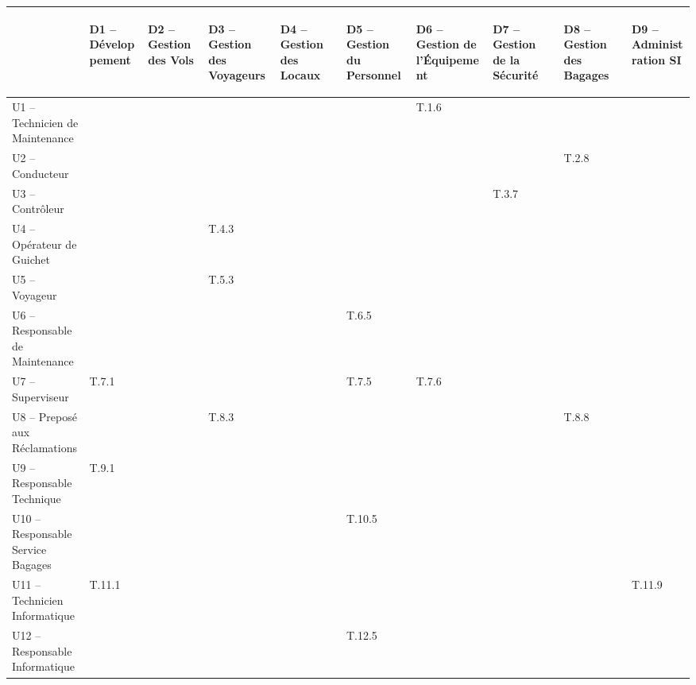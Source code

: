 \providecommand{\DJSPU}[1]{}

\begin{turn}{-90}
\begin {tabular} {| l | l | l | l | l | l | l | l | l | l | }
\hline
~
&\begin{sideways}D1 -- Développement\end{sideways}
&\begin{sideways}D2 -- Gestion des Vols\end{sideways}
&\begin{sideways}D3 -- Gestion des Voyageurs\end{sideways}
&\begin{sideways}D4 -- Gestion des Locaux\end{sideways}
&\begin{sideways}D5 -- Gestion du Personnel\end{sideways}
&\begin{sideways}D6 -- Gestion de l'Équipement\end{sideways}
&\begin{sideways}D7 -- Gestion de la Sécurité\end{sideways}
&\begin{sideways}D8 -- Gestion des Bagages\end{sideways}
&\begin{sideways}D9 -- Administration SI\end{sideways}\\
\hline
U1 --  Technicien de Maintenance  & & & & & &T.1.6 & & &  \\
\hline
U2 --  Conducteur  & & & & & & & &T.2.8 &  \\
\hline
U3 --  Contrôleur  & & & & & & &T.3.7 & &  \\
\hline
U4 --  Opérateur de Guichet  & & &T.4.3 & & & & & &  \\
\hline
U5 --  Voyageur  & & &T.5.3 & & & & & &  \\
\hline
U6 --  Responsable de Maintenance  & & & & &T.6.5 & & &  &\\
\hline
U7 --  Superviseur  &\DJSPU1 T.7.1 & & & & T.7.5 &T.7.6 & & &\\
\hline
U8 --  Preposé aux Réclamations  & & &T.8.3 & & & & &T.8.8 &\\
\hline
U9 --  Responsable Technique  &\DJSPU1 T.9.1 & & & & & & & &\\
\hline
U10 --  Responsable Service Bagages & & & & &T.10.5 & & & &  \\
\hline
U11 --  Technicien Informatique  &T.11.1 & & & & & & & &T.11.9  \\
\hline
U12 --  Responsable Informatique  & & & & &T.12.5 & & & &  \\
\hline
\end {tabular}
\end{turn}

